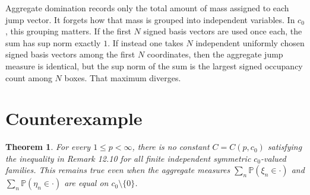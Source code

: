 \documentclass[11pt]{article}
\newtheorem{theorem}{Theorem}
\begin{document}
Aggregate domination records only the total amount of mass assigned to each
jump vector.  It forgets how that mass is grouped into independent variables.
In \(c_0\), this grouping matters.  If the first \(N\) signed basis vectors are
used once each, the sum has sup norm exactly \(1\).  If instead one takes
\(N\) independent uniformly chosen signed basis vectors among the first \(N\)
coordinates, then the aggregate jump measure is identical, but the sup norm of
the sum is the largest signed occupancy count among \(N\) boxes.  That maximum
diverges.

\section*{Counterexample}

\begin{theorem}
For every \(1\leq p<\infty\), there is no constant \(C=C(p,c_0)\) satisfying
the inequality in Remark 12.10 for all finite independent symmetric
\(c_0\)-valued families.  This remains true even when the aggregate measures
\(\sum_n {\mathbb P}(\xi_n\in\cdot)\) and
\(\sum_n {\mathbb P}(\eta_n\in\cdot)\) are equal on \(c_0\setminus\{0\}\).
\end{theorem}
\end{document}
